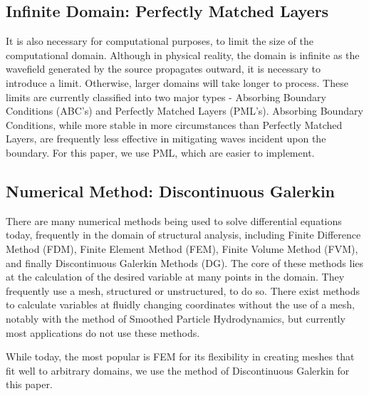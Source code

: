 \subsection{Infinite Domain: Perfectly Matched Layers}

It is also necessary for computational purposes, to limit the size of the computational domain. Although in physical reality, the domain is infinite as the wavefield generated by the source propagates outward, it is necessary to introduce a limit. Otherwise, larger domains will take longer to process. These limits are currently classified into two major types - Absorbing Boundary Conditions (ABC's) and Perfectly Matched Layers (PML's). Absorbing Boundary Conditions, while more stable in more circumstances than Perfectly Matched Layers, are frequently less effective in mitigating waves incident upon the boundary. For this paper, we use PML, which are easier to implement.

\subsection{Numerical Method: Discontinuous Galerkin}

There are many numerical methods being used to solve differential equations today, frequently in the domain of structural analysis, including Finite Difference Method (FDM), Finite Element Method (FEM), Finite Volume Method (FVM), and finally Discontinuous Galerkin Methods (DG). The core of these methods lies at the calculation of the desired variable at many points in the domain. They frequently use a mesh, structured or unstructured, to do so. There exist methods to calculate variables at fluidly changing coordinates without the use of a mesh, notably with the method of Smoothed Particle Hydrodynamics, but currently most applications do not use these methods. 

While today, the most popular is FEM for its flexibility in creating meshes that fit well to arbitrary domains, we use the method of Discontinuous Galerkin for this paper.






